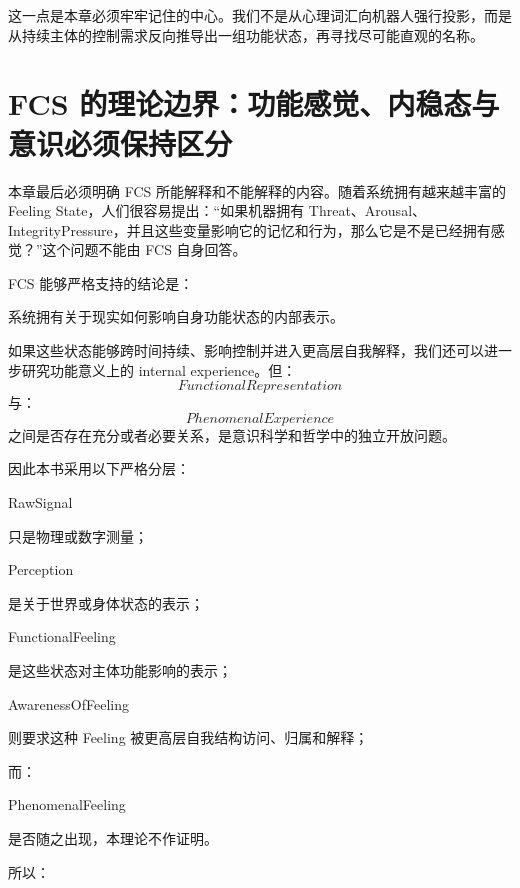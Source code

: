 这一点是本章必须牢牢记住的中心。我们不是从心理词汇向机器人强行投影，而是从持续主体的控制需求反向推导出一组功能状态，再寻找尽可能直观的名称。

\section{FCS 的理论边界：功能感觉、内稳态与意识必须保持区分}

本章最后必须明确 FCS 所能解释和不能解释的内容。随着系统拥有越来越丰富的 Feeling State，人们很容易提出：“如果机器拥有 Threat、Arousal、IntegrityPressure，并且这些变量影响它的记忆和行为，那么它是不是已经拥有感觉？”这个问题不能由 FCS 自身回答。

FCS 能够严格支持的结论是：
\begin{conclusion}
系统拥有关于现实如何影响自身功能状态的内部表示。
\end{conclusion}
如果这些状态能够跨时间持续、影响控制并进入更高层自我解释，我们还可以进一步研究功能意义上的 internal experience。但：
\[
FunctionalRepresentation
\]
与：
\[
PhenomenalExperience
\]
之间是否存在充分或者必要关系，是意识科学和哲学中的独立开放问题。

因此本书采用以下严格分层：

\begin{statementbox}
RawSignal
\end{statementbox}
只是物理或数字测量；

\begin{statementbox}
Perception
\end{statementbox}
是关于世界或身体状态的表示；

\begin{statementbox}
FunctionalFeeling
\end{statementbox}
是这些状态对主体功能影响的表示；

\begin{statementbox}
AwarenessOfFeeling
\end{statementbox}
则要求这种 Feeling 被更高层自我结构访问、归属和解释；

而：

\begin{statementbox}
PhenomenalFeeling
\end{statementbox}
是否随之出现，本理论不作证明。

所以：
\begin{statementbox}
\centering
{}
\end{statementbox}

